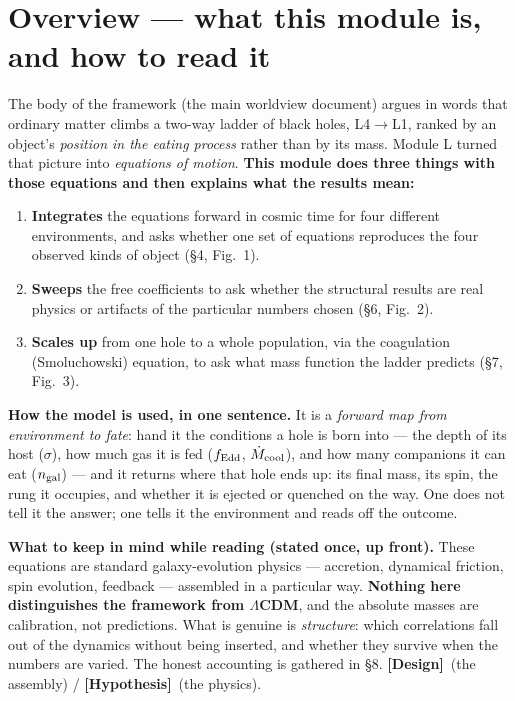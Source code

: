 \documentclass[11pt]{article}
\newcommand{\Hyp}{\textbf{\textcolor{blue!55!black}{[Hypothesis]}}}
\newcommand{\Design}{\textbf{\textcolor{purple!65!black}{[Design]}}}
\begin{document}
\section{Overview --- what this module is, and how to read it}
The body of the framework (the main worldview document) argues in words that ordinary matter climbs a two-way ladder of black holes, L4$\to$L1, ranked by an object's \emph{position in the eating process} rather than by its mass. Module L turned that picture into \emph{equations of motion}. \textbf{This module does three things with those equations and then explains what the results mean:}
\begin{enumerate}[leftmargin=1.5em,itemsep=2pt]
\item \textbf{Integrates} the equations forward in cosmic time for four different environments, and asks whether one set of equations reproduces the four observed kinds of object (\S4, Fig.~1).
\item \textbf{Sweeps} the free coefficients to ask whether the structural results are real physics or artifacts of the particular numbers chosen (\S6, Fig.~2).
\item \textbf{Scales up} from one hole to a whole population, via the coagulation (Smoluchowski) equation, to ask what mass function the ladder predicts (\S7, Fig.~3).
\end{enumerate}

\textbf{How the model is used, in one sentence.} It is a \emph{forward map from environment to fate}: hand it the conditions a hole is born into --- the depth of its host ($\sigma$), how much gas it is fed ($f_{\rm Edd}$, $\dot M_{\rm cool}$), and how many companions it can eat ($n_{\rm gal}$) --- and it returns where that hole ends up: its final mass, its spin, the rung it occupies, and whether it is ejected or quenched on the way. One does not tell it the answer; one tells it the environment and reads off the outcome.

\textbf{What to keep in mind while reading (stated once, up front).} These equations are standard galaxy-evolution physics --- accretion, dynamical friction, spin evolution, feedback --- assembled in a particular way. \textbf{Nothing here distinguishes the framework from $\Lambda$CDM}, and the absolute masses are calibration, not predictions. What is genuine is \emph{structure}: which correlations fall out of the dynamics without being inserted, and whether they survive when the numbers are varied. The honest accounting is gathered in \S8. \Design\ (the assembly) / \Hyp\ (the physics).
\end{document}
